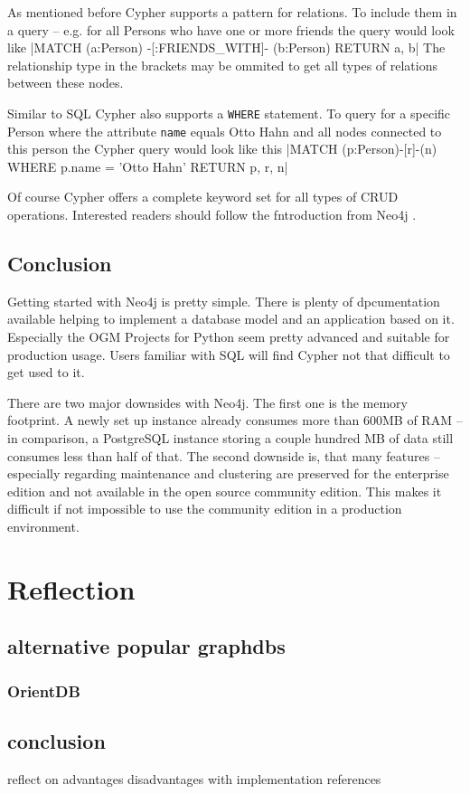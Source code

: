 As mentioned before Cypher supports a pattern for relations.
To include them in a query -- e.g. for all Persons who have one or more friends the query would look like |MATCH (a:Person) -[:FRIENDS_WITH]- (b:Person) RETURN a, b|
The relationship type in the brackets may be ommited to get all types of relations between these nodes.

Similar to SQL Cypher also supports a \texttt{WHERE} statement.
To query for a specific Person where the attribute \texttt{name} equals \glqq Otto Hahn\grqq{} and all nodes connected to this person the Cypher query would look like this |MATCH (p:Person)-[r]-(n) WHERE p.name = 'Otto Hahn' RETURN p, r, n|

Of course Cypher offers a complete keyword set for all types of CRUD operations. Interested readers should follow the fntroduction from Neo4j \autocite{neo4j:cypher_introduction}.

\subsection{Conclusion}
Getting started with Neo4j is pretty simple.
There is plenty of dpcumentation available helping to implement a database model and an application based on it.
Especially the OGM Projects for Python seem pretty advanced and suitable for production usage.
Users familiar with SQL will find Cypher not that difficult to get used to it.

There are two major downsides with Neo4j. The first one is the memory footprint.
A newly set up instance already consumes more than 600MB of RAM -- in comparison, a PostgreSQL instance storing a couple hundred MB of data still consumes less than half of that.
The second downside is, that many features -- especially regarding maintenance and clustering are preserved for the enterprise edition and not available in the open source community edition. This makes it difficult if not impossible to use the community edition in a production environment.

\section{Reflection}
\subsection{alternative popular graphdbs}
\subsubsection{OrientDB}
\subsection{conclusion}
reflect on advantages disadvantages with implementation references
